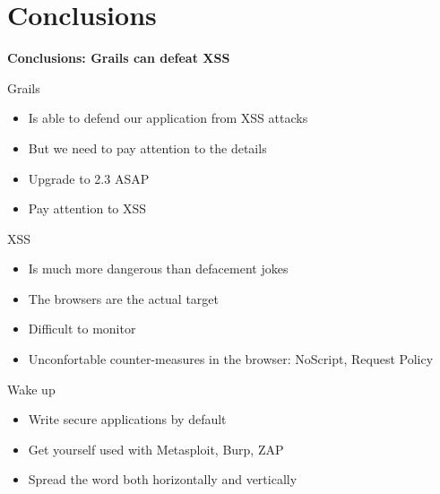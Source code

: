 
\section{Conclusions}

\begin{frame}[plain]
    \begin{center}
      \Huge\bfseries
      Conclusions: Grails can defeat XSS
    \end{center}
\end{frame}

\begin{frame}[plain]{Grails}
  \begin{itemize}[<+-| alert@+>]
    \item Is able to defend our application from XSS attacks
    \item But we need to pay attention to the details
    \item Upgrade to 2.3 ASAP
    \item Pay attention to XSS
  \end{itemize}
\end{frame}

\begin{frame}[plain]{XSS}
  \begin{itemize}[<+-| alert@+>]
    \item Is much more dangerous than defacement jokes
    \item The browsers are the actual target
    \item Difficult to monitor
    \item Unconfortable counter-measures in the browser: NoScript, Request Policy
  \end{itemize}
\end{frame}

\begin{frame}[plain]{Wake up}
 \begin{itemize}[<+-| alert@+>]
   \item Write secure applications by default
   \item Get yourself used with Metasploit, Burp, ZAP
   \item Spread the word both horizontally and vertically
 \end{itemize}
\end{frame}
